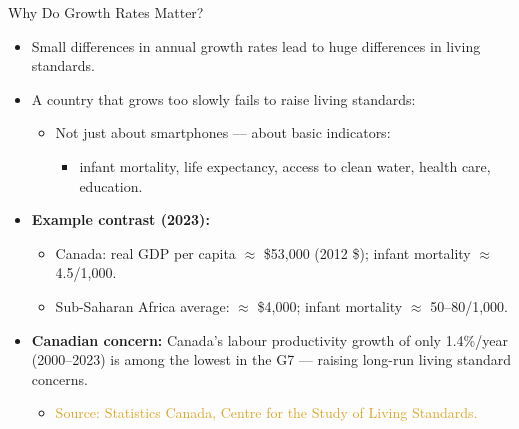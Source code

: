 \documentclass[aspectratio=169]{beamer}
\begin{document}
\begin{frame}{Why Do Growth Rates Matter?}
\transfade
\begin{itemize}
  \item Small differences in annual growth rates lead to \alert{huge} differences in living standards.
  \item A country that grows too slowly fails to raise living standards:
  \begin{itemize}
    \item Not just about smartphones --- about basic indicators:
    \begin{itemize}
      \item infant mortality, life expectancy, access to clean water, health care, education.
    \end{itemize}
  \end{itemize}
  \item \textbf{Example contrast (2023):}
  \begin{itemize}
    \item Canada: real GDP per capita $\approx$ \$53{,}000 (2012 \$); infant mortality $\approx$ 4.5/1{,}000.
    \item Sub-Saharan Africa average: $\approx$ \$4{,}000; infant mortality $\approx$ 50--80/1{,}000.
  \end{itemize}
  \item \textbf{Canadian concern:} Canada's labour productivity growth of only \alert{1.4\%/year} (2000--2023) is among the lowest in the G7 --- raising long-run living standard concerns.
  \begin{itemize}
    \item \textcolor{goldenrod}{Source: Statistics Canada, Centre for the Study of Living Standards.}
  \end{itemize}
\end{itemize}
\end{frame}
\end{document}
